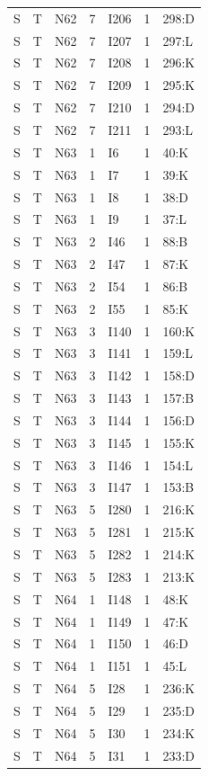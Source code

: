 {\begin{longtable}{lllrlrp{.35\linewidth}}
S & T & N62 & 7 & I206 & 1 & 298:D \\
S & T & N62 & 7 & I207 & 1 & 297:L \\
S & T & N62 & 7 & I208 & 1 & 296:K \\
S & T & N62 & 7 & I209 & 1 & 295:K \\
S & T & N62 & 7 & I210 & 1 & 294:D \\
S & T & N62 & 7 & I211 & 1 & 293:L \\
S & T & N63 & 1 & I6 & 1 & 40:K \\
S & T & N63 & 1 & I7 & 1 & 39:K \\
S & T & N63 & 1 & I8 & 1 & 38:D \\
S & T & N63 & 1 & I9 & 1 & 37:L \\
S & T & N63 & 2 & I46 & 1 & 88:B \\
S & T & N63 & 2 & I47 & 1 & 87:K \\
S & T & N63 & 2 & I54 & 1 & 86:B \\
S & T & N63 & 2 & I55 & 1 & 85:K \\
S & T & N63 & 3 & I140 & 1 & 160:K \\
S & T & N63 & 3 & I141 & 1 & 159:L \\
S & T & N63 & 3 & I142 & 1 & 158:D \\
S & T & N63 & 3 & I143 & 1 & 157:B \\
S & T & N63 & 3 & I144 & 1 & 156:D \\
S & T & N63 & 3 & I145 & 1 & 155:K \\
S & T & N63 & 3 & I146 & 1 & 154:L \\
S & T & N63 & 3 & I147 & 1 & 153:B \\
S & T & N63 & 5 & I280 & 1 & 216:K \\
S & T & N63 & 5 & I281 & 1 & 215:K \\
S & T & N63 & 5 & I282 & 1 & 214:K \\
S & T & N63 & 5 & I283 & 1 & 213:K \\
S & T & N64 & 1 & I148 & 1 & 48:K \\
S & T & N64 & 1 & I149 & 1 & 47:K \\
S & T & N64 & 1 & I150 & 1 & 46:D \\
S & T & N64 & 1 & I151 & 1 & 45:L \\
S & T & N64 & 5 & I28 & 1 & 236:K \\
S & T & N64 & 5 & I29 & 1 & 235:D \\
S & T & N64 & 5 & I30 & 1 & 234:K \\
S & T & N64 & 5 & I31 & 1 & 233:D \\

\end{longtable}}

